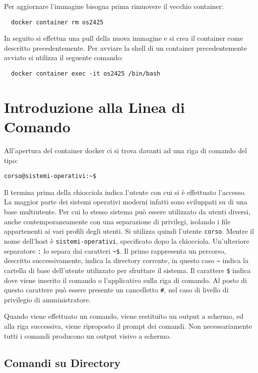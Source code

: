 \documentclass{article}
\numberwithin{equation}{subsection}
\begin{document}
Per aggiornare l'immagine bisogna prima rimuovere il vecchio container:
\begin{verbatim}
  docker container rm os2425
\end{verbatim}
In seguito si effettua una pull della nuova immagine e si crea il container come descritto precedentemente. Per avviare la shell di un container precedentemente avviato si utilizza il 
seguente comando:
\begin{verbatim}
  docker container exec -it os2425 /bin/bash
\end{verbatim}

\clearpage

\section{Introduzione alla Linea di Comando}

All'apertura del container docker ci si trova davanti ad una riga di comando del tipo:
\begin{verbatim}
corso@sistemi-operativi:~$    
\end{verbatim}

Il termina prima della chiocciola indica l'utente con cui si è effettuato l'accesso. La maggior parte dei sistemi operativi moderni infatti sono sviluppati su di una base multiutente. Per cui lo stesso sistema può 
essere utilizzato da utenti diversi, anche contemporaneamente con una separazione di privilegi, isolando i file appartenenti ai vari profili degli utenti. Si utilizza quindi l'utente \verb|corso|. Mentre il nome 
dell'host è \verb|sistemi-operativi|, specificato dopo la chiocciola. Un'ulteriore separatore \verb|:| lo separa dai caratteri \verb|~$|. Il primo rappresenta un percorso, descritto successivamente, indica 
la directory corrente, in questo caso \verb|~| indica la cartella di base dell'utente utilizzato per sfruttare il sistema. Il carattere \verb|$| indica dove viene inserito il comando o l'applicativo sulla riga 
di comando. Al posto di questo carattere può essere presente un cancelletto \verb|#|, nel caso di livello di privilegio di amministratore. 

Quando viene effettuato un comando, viene restituito un output a schermo, ed alla riga successiva, viene riproposto il prompt dei comandi. Non necessariamente tutti i comandi producono un output visivo a schermo. 

\subsection{Comandi su Directory}
\end{document}
